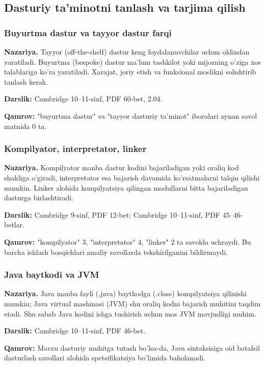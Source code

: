 \documentclass[10pt,a4paper]{article}
\begin{document}
\subsection{Dasturiy ta'minotni tanlash va tarjima qilish}
\subsubsection*{Buyurtma dastur va tayyor dastur farqi}
\textbf{Nazariya.} Tayyor (off-the-shelf) dastur keng
foydalanuvchilar uchun oldindan yaratiladi. Buyurtma
(bespoke) dastur ma'lum tashkilot yoki mijozning
o'ziga xos talablariga ko'ra yaratiladi.
Xarajat, joriy etish va funksional moslikni solishtirib tanlash kerak.
\par\textbf{Darslik:} Cambridge 10--11-sinf, PDF 60-bet, 2.04.
\par\textbf{Qamrov:} "buyurtma dastur" va "tayyor dasturiy
ta'minot" iboralari aynan savol matnida 0 ta.
\subsubsection*{Kompilyator, interpretator, linker}
\textbf{Nazariya.} Kompilyator manba dastur kodini bajariladigan
yoki oraliq kod shakliga o'giradi, interpretator esa
bajarish davomida ko'rsatmalarni talqin qilishi mumkin.
Linker alohida kompilyatsiya qilingan modullarni
bitta bajariladigan dasturga birlashtiradi.
\par\textbf{Darslik:} Cambridge 9-sinf, PDF 12-bet;
Cambridge 10--11-sinf, PDF 45--46-betlar.
\par\textbf{Qamrov:} "kompilyator" 3, "interpretator" 4,
"linker" 2 ta savolda uchraydi. Bu barcha ishlash bosqichlari
amaliy savollarda tekshirilganini bildirmaydi.
\subsubsection*{Java baytkodi va JVM}
\textbf{Nazariya.} Java manba fayli (.java) baytkodga
(.class) kompilyatsiya qilinishi mumkin; Java virtual
mashinasi (JVM) shu oraliq kodni bajarish muhitini taqdim etadi.
Shu sabab Java kodini ishga tushirish uchun mos JVM mavjudligi muhim.
\par\textbf{Darslik:} Cambridge 10--11-sinf, PDF 46-bet.
\par\textbf{Qamrov:} Mavzu dasturiy muhitga tutash bo'lsa-da,
Java sintaksisiga oid batafsil dasturlash savollari alohida
spetsifikatsiya bo'limida baholanadi.
\end{document}
